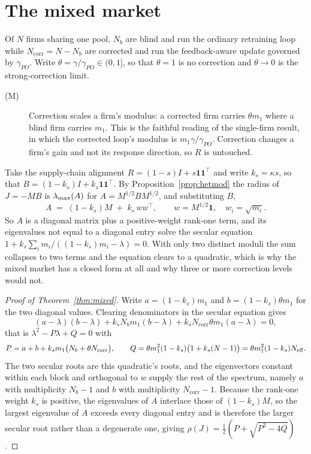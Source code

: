 \section{The mixed market}
\label{app:mixed}

Of $N$ firms sharing one pool, $N_b$ are blind and run the ordinary retraining loop while $N_{\text{corr}} = N - N_b$ are corrected and run the feedback-aware update governed by $\gamma_{PO}$. Write $\theta = \gamma/\gamma_{PO} \in (0,1]$, so that $\theta=1$ is no correction and $\theta \to 0$ is the strong-correction limit.

\begin{description}
\item[(M)] Correction scales a firm's modulus: a corrected firm carries $\theta m_1$ where a blind firm carries $m_1$. This is the faithful reading of the single-firm result, in which the corrected loop's modulus is $m_1\gamma/\gamma_{PO}$. Correction changes a firm's gain and not its response direction, so $R$ is untouched.
\end{description}

Take the supply-chain alignment $R = (1-s)I + s\mathbf{1}\mathbf{1}^{\top}$ and write $k_s = \kappa s$, so that $B = (1-k_s)I + k_s\mathbf{1}\mathbf{1}^{\top}$. By Proposition~\ref{prop:hetmod} the radius of $J = -MB$ is $\lambda_{\max}(A)$ for $A = M^{1/2}BM^{1/2}$, and substituting $B$,
\[
  A \;=\; (1-k_s)M \;+\; k_s\, ww^{\top}, \qquad w = M^{1/2}\mathbf{1}, \quad w_i = \sqrt{m_i}.
\]
So $A$ is a diagonal matrix plus a positive-weight rank-one term, and its eigenvalues not equal to a diagonal entry solve the secular equation $1 + k_s\sum_i m_i/((1-k_s)m_i - \lambda) = 0$. With only two distinct moduli the sum collapses to two terms and the equation clears to a quadratic, which is why the mixed market has a closed form at all and why three or more correction levels would not.

\begin{proof}[Proof of Theorem~\ref{thm:mixed}]
Write $a = (1-k_s)m_1$ and $b = (1-k_s)\theta m_1$ for the two diagonal values. Clearing denominators in the secular equation gives
\[
  (a-\lambda)(b-\lambda) + k_s N_b m_1 (b-\lambda) + k_s N_{\text{corr}}\theta m_1 (a-\lambda) = 0,
\]
that is $\lambda^2 - P\lambda + Q = 0$ with
\[
  P = a + b + k_s m_1\big(N_b + \theta N_{\text{corr}}\big),
  \qquad
  Q = \theta m_1^2 (1-k_s)\big(1 + k_s(N-1)\big) = \theta m_1^2 (1-k_s)N_{\mathrm{eff}} .
\]
The two secular roots are this quadratic's roots, and the eigenvectors constant within each block and orthogonal to $w$ supply the rest of the spectrum, namely $a$ with multiplicity $N_b-1$ and $b$ with multiplicity $N_{\text{corr}}-1$. Because the rank-one weight $k_s$ is positive, the eigenvalues of $A$ interlace those of $(1-k_s)M$, so the largest eigenvalue of $A$ exceeds every diagonal entry and is therefore the larger secular root rather than a degenerate one, giving $\rho(J) = \tfrac{1}{2}(P + \sqrt{P^2-4Q})$.
\end{proof}

